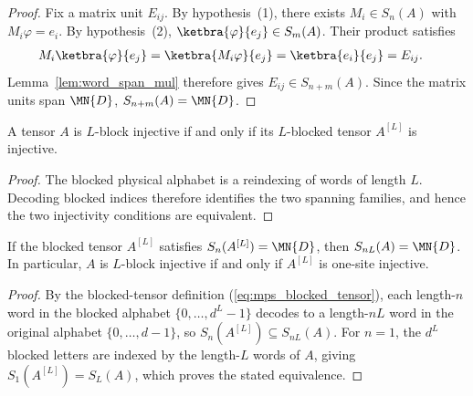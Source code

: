 \begin{proof}
    \leanok
    Fix a matrix unit $E_{ij}$.
    By hypothesis~(1), there exists $M_i\in S_n(A)$
    with $M_i\varphi=e_i$.
    By hypothesis~(2), $\ketbra{\varphi}{e_j}\in S_m(A)$.
    Their product satisfies
    \begin{align}
        M_i\ketbra{\varphi}{e_j}
         & =\ketbra{M_i\varphi}{e_j}
        =\ketbra{e_i}{e_j}
        =E_{ij}.
        \notag
    \end{align}
    Lemma~\ref{lem:word_span_mul} therefore gives
    $E_{ij}\in S_{n+m}(A)$.
    Since the matrix units span $\MN{D}$,
    $S_{n+m}(A)=\MN{D}$.
\end{proof}

\begin{lemma}
    \label{lem:isNBlkInjective_iff_blockTensor_isInjective}
    \leanok
    A tensor $A$ is $L$-block injective if and only if its $L$-blocked
    tensor $A^{[L]}$ is injective.
\end{lemma}

\begin{proof}
    \leanok
    The blocked physical alphabet is a reindexing of words of length $L$.
    Decoding blocked indices therefore identifies the two spanning families,
    and hence the two injectivity conditions are equivalent.
\end{proof}

\begin{lemma}\label{lem:blocking_transfer}
    \leanok
    If the blocked tensor $A^{[L]}$ satisfies
    $S_n(A^{[L]})=\MN{D}$, then $S_{nL}(A)=\MN{D}$.
    In particular, $A$ is $L$-block injective if and only if $A^{[L]}$ is
    one-site injective.
\end{lemma}

\begin{proof}
    \leanok
    By the blocked-tensor definition (\ref{eq:mps_blocked_tensor}), each
    length-$n$ word in the blocked alphabet
    $\{0,\ldots,d^L-1\}$ decodes to a length-$nL$ word
    in the original alphabet $\{0,\ldots,d-1\}$, so
    $S_n(A^{[L]})\subseteq S_{nL}(A)$.
    For $n=1$, the $d^L$ blocked letters are indexed by the length-$L$ words
    of $A$, giving $S_1(A^{[L]})=S_L(A)$, which proves the stated
    equivalence.
\end{proof}

